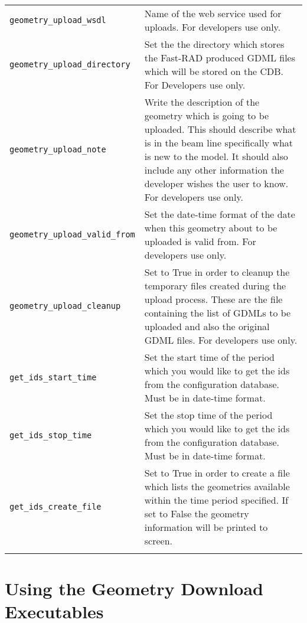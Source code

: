 \begin{table*}
\begin{center}
\begin{tabularx}{\textwidth}{lX}
\verb|geometry_upload_wsdl| & Name of the web service used for uploads. For developers use only.\\
\verb|geometry_upload_directory| & Set the the directory which stores the Fast-RAD produced GDML files which will be stored on the CDB. For Developers
use only.\\
\verb|geometry_upload_note| & Write the description of the geometry which is going to be uploaded. This should describe what is in the beam line
specifically what is new to the model. It should also include any other information the developer wishes the user to know. For developers use only.\\
\verb|geometry_upload_valid_from| & Set the date-time format of the date when this geometry about to be uploaded is valid from. For developers use
only.\\
\verb|geometry_upload_cleanup| & Set to True in order to cleanup the temporary files created during the upload process. These are the file
containing the list of GDMLs to be uploaded and also the original GDML files. For developers use only.\\
\verb|get_ids_start_time| & Set the start time of the period which you would like to get the ids from the configuration database. Must be in
date-time format.\\
\verb|get_ids_stop_time| & Set the stop time of the period which you would like to get the ids from the configuration database. Must be in
date-time format.\\
\verb|get_ids_create_file| & Set to True in order to create a file which lists the geometries available within the time period specified. If set to
False the geometry information will be printed to screen.\\
\begin{makeimage} %
\end{makeimage} 
\end{tabularx}
\end{center}
\end{table*}

\section{Using the Geometry Download Executables}

